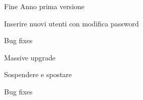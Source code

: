 \begin{changelog}[author=JOHN DOE, sectioncmd=\section*]
	\begin{version}[v=1.0.1,
		date=2023-07-17]
		\added
		\item Fine Anno prima versione
		\item Inserire nuovi utenti con modifica password
		\fixed
		\item Bug fixes
	\end{version}
	\begin{version}[v=1.0.0,
		date=2023-07-15]
		\added
		\item Massive upgrade
		\item Sospendere e spostare
		\fixed
		\item Bug fixes
	\end{version}
	\end{changelog}
	\listoftodos